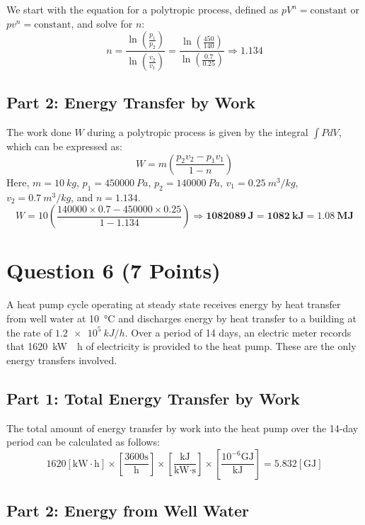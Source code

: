 \documentclass{article}
\begin{document}
We start with the equation for a polytropic process, defined as \( pV^n = \text{constant} \) or \( pv^n = \text{constant} \), and solve for \( n \):
\[
n = \frac{\ln\left(\frac{p_1}{p_2}\right)}{\ln\left(\frac{v_2}{v_1}\right)} = \frac{\ln\left(\frac{450}{140}\right)}{\ln\left(\frac{0.7}{0.25}\right)} \Rightarrow \mathbf{1.134}
\]

\subsection*{Part 2: Energy Transfer by Work}

The work done \( W \) during a polytropic process is given by the integral \(\int PdV\), which can be expressed as:
\[
W = m \left( \frac{p_2v_2 - p_1v_1}{1-n} \right)
\]
Here, \( m = \SI{10}{kg} \), \( p_1 = \SI{450000}{Pa} \), \( p_2 = \SI{140000}{Pa} \), \( v_1 = \SI{0.25}{m^3/kg} \), \( v_2 = \SI{0.7}{m^3/kg} \), and \( n = 1.134 \).
\[
W = 10 \left( \frac{140000 \times 0.7 - 450000 \times 0.25}{1-1.134} \right) \Rightarrow \mathbf{\SI{1082089}{J} = \SI{1082}{kJ} = \SI{1.08}{MJ}}
\]

\newpage
\section*{Question 6 (7 Points)}

A heat pump cycle operating at steady state receives energy by heat transfer from well water at \SI{10}{\degreeCelsius} and discharges energy by heat transfer to a building at the rate of \(\SI{1.2e5}{kJ/h}\). Over a period of 14 days, an electric meter records that \SI{1620}{kW \cdot h} of electricity is provided to the heat pump. These are the only energy transfers involved.

\subsection*{Part 1: Total Energy Transfer by Work}

The total amount of energy transfer by work into the heat pump over the 14-day period can be calculated as follows:
\[
1620\left[\text{kW}\cdot \text{h}\right]\times\left[\frac{3600\text{s}}{\text{h}}\right]\times\left[\frac{\text{kJ}}{\text{kW}\cdot \text{s}}\right]\times\left[\frac{{10}^{-6}\text{GJ}}{\text{kJ}}\right]=\mathbf{5.832}\left[\text{GJ}\right]
\]

\subsection*{Part 2: Energy from Well Water}
\end{document}
